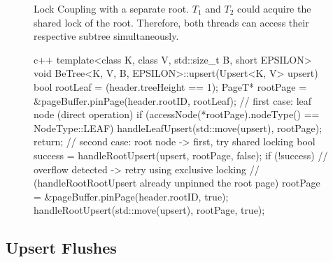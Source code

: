 \begin{figure}[h]
{
	}
	\caption[Lock Coupling with a separate root]{Lock Coupling with a separate root. $T_1$ and $T_2$ could acquire the shared lock of the root. Therefore, both threads can access their respective subtree simultaneously.}
	\label{fig:separate_root}
\end{figure}

\begin{figure}[h]
	\centering
	\label{fig:upsert_procedure}
	\vspace*{5mm}
	\begin{cminted}[linenos=false]{c++}
template<class K, class V, std::size_t B, short EPSILON>
void BeTree<K, V, B, EPSILON>::upsert(Upsert<K, V> upsert) {
    bool rootLeaf = (header.treeHeight == 1);
    PageT* rootPage = &pageBuffer.pinPage(header.rootID, rootLeaf);
    // first case: leaf node (direct operation)
    if (accessNode(*rootPage).nodeType() == NodeType::LEAF) {
        handleLeafUpsert(std::move(upsert), rootPage);
        return;
    }
    // second case: root node -> first, try shared locking
    bool success = handleRootUpsert(upsert, rootPage, false);
    if (!success) {
        // overflow detected -> retry using exclusive locking
        // (handleRootRootUpsert already unpinned the root page)
        rootPage = &pageBuffer.pinPage(header.rootID, true);
        handleRootUpsert(std::move(upsert), rootPage, true);
    }
}
	\end{cminted}
\end{figure}

\subsection{Upsert Flushes} \label{5.2.3}

